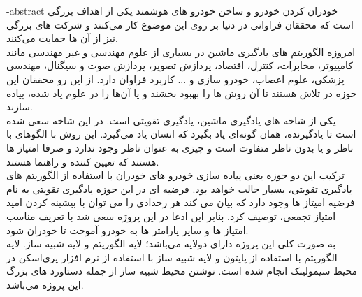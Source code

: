 
\fa-abstract{
خودران کردن خودرو و ساخن خودرو های هوشمند یکی از اهداف بزرگی است که محققان فراوانی در دنیا بر روی این موضوع کار می‌کنند و شرکت های بزرگی نیز از آن ها حمایت می‌کنند. 
\\
امروزه الگوریتم های یادگیری ماشین در بسیاری از علوم مهندسی و غیر مهندسی مانند کامپیوتر، مخابرات، کنترل، اقتصاد، پردازش تصویر، پردازش صوت و سیگنال، مهندسی پزشکی، علوم اعصاب، خودرو سازی و ... کاربرد فراوان دارد. از این رو محققان این حوزه در تلاش هستند تا آن روش ها را بهبود بخشند و یا آن‌ها را در علوم یاد شده، پیاده سازند. 
\\
یکی از شاخه های یادگیری ماشین، یادگیری تقویتی است. 
در این شاخه سعی شده است تا یادگیرنده، همان گونه‌ای یاد بگیرد که انسان یاد می‌گیرد. این روش با الگوهای با ناظر و یا بدون ناظر متفاوت است و چیزی به عنوان ناظر وجود ندارد و صرفا امتیاز ها هستند که تعیین کننده و راهنما هستند. 
\\
ترکیب این دو حوزه یعنی پیاده سازی خودرو های خودران با استفاده از الگوریتم های یادگیری تقویتی، بسیار جالب خواهد بود.  فرضیه ای در این حوزه یادگیری تقویتی به نام فرضیه امیتاز ها وجود دارد که بیان می کند هر رخدادی را می توان با بیشینه کردن امید امتیاز تجمعی، توصیف کرد. بنابر این ادعا در این پروژه سعی شد با تعریف مناسب امتیاز ها و سایر پارامتر ها به 
خودرو آموخت تا خودران شود. 
\\
به صورت کلی این پروژه دارای دولایه می‌باشد؛ لایه الگوریتم و لایه شبیه ساز. لایه الگوریتم با استفاده از پایتون و لایه شبیه ساز با استفاده از نرم افزار پری‌اسکن در محیط سیمولینک انجام شده است. نوشتن محیط شبیه ساز از جمله دستاورد های بزرگ این پروژه می‌باشد.
%
}




